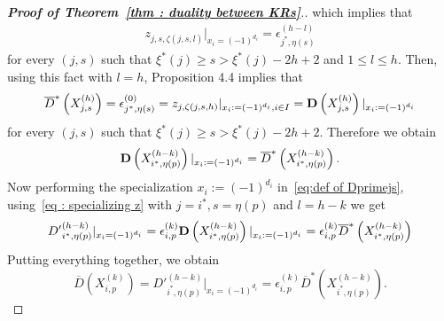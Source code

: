 \documentclass[12pt]{amsart}
\theoremstyle{plain}
\theoremstyle{definition}
\numberwithin{equation}{section}
\newcommand{\barD}{\overline{D}}
\newcommand{\barDstar}{\overline{D}^{*}}
\newcommand{\xistar}{\xi^{*}}
\begin{document}
\begin{proof}[ \textbf{Proof of Theorem~\ref{thm : duality between KRs}}.]
 which implies that
\begin{align} \label{eq : specializing z}
     z_{j,s, \zeta(j,s,l)}|_{x_i = (-1)^{d_i}}  = \epsilon_{j^{*} , \eta(s)}^{(h-l)}  
\end{align}
      for  every $(j,s)$ such that $\xistar(j) \geq s > \xistar(j)-2h+2$ and $1 \leq l \leq  h$. Then, using this fact with $l=h$, Proposition 4.4  implies that 
 $$ \barDstar \left( X_{j,s}^{(h)} \right) = \epsilon_{j^{*},\eta(s)}^{(0)} = z_{j, \zeta(j,s,h)} |_{x_i := (-1)^{d_i} , i \in I} = {\bf D} \left( X_{j,s}^{(h)} \right)|_{x_i := (-1)^{d_i}} $$
 for every $(j,s)$ such that $\xistar(j) \geq s > \xistar(j)-2h+2$. Therefore we obtain 
 $$ {\bf D}  \left( X_{i^{*} , \eta(p)}^{(h-k)} \right)|_{x_i := (-1)^{d_i}} = \barDstar \left( X_{i^{*} , \eta(p)}^{(h-k)} \right) . $$
 Now performing the specialization $x_i := (-1)^{d_i}$  in~\eqref{eq:def of Dprimejs}, using~\eqref{eq : specializing z} with $j=i^{*}, s = \eta(p)$ and $l=h-k$ we get 
 $${D'}_{i^{*} , \eta(p)}^{(h-k)}|_{x_i = (-1)^{d_i}} =\epsilon_{i,p}^{(k)} {\bf D}  \left( X_{i^{*} , \eta(p)}^{(h-k)} \right)|_{x_i := (-1)^{d_i}} =\epsilon_{i,p}^{(k)} \barDstar  \left( X_{i^{*} , \eta(p)}^{(h-k)} \right)  $$
 Putting everything together, we obtain 
 $$\barD \left( X_{i,p}^{(k)} \right) = {D'}_{i^{*} , \eta(p)}^{(h-k)}|_{x_i = (-1)^{d_i}} = \epsilon_{i,p}^{(k)} \barDstar  \left( X_{i^{*} , \eta(p)}^{(h-k)} \right) . $$






\end{proof}
\end{document}
